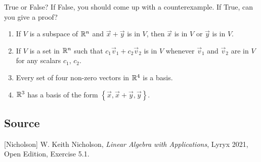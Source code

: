 \documentclass{ximera}
\author{}
\begin{document}
\begin{exercise}

True or False?  If False, you should come up with a counterexample.  If True, can you give a proof?

 \begin{enumerate}
     \item If $V$ is a subspace of $\mathbb{R}^n$ and $\vec{x}+\vec{y}$ is in $V$, then $\vec{x}$ is in $V$ or $\vec{y}$ is in $V$.

 \begin{multipleChoice}
 \end{multipleChoice}

\item If $V$ is a set in $\mathbb{R}^n$ such that $c_1{\vec{v}_1}+c_2{\vec{v}_2}$ is in $V$ whenever ${\vec{v}_1}$ and ${\vec{v}_2}$ are in $V$ for any scalars $c_1$, $c_2$.

 \begin{multipleChoice}
 \end{multipleChoice}

 \item Every set of four non-zero vectors in $\mathbb{R}^4$ is a basis.

 \begin{multipleChoice}
 \end{multipleChoice}

 \item $\mathbb{R}^3$ has a basis of the form $\left\{\vec{x},\vec{x}+\vec{y},\vec{y}\right\}$.

 \begin{multipleChoice}
 \end{multipleChoice}
 \end{enumerate}

 
\end{exercise}

\subsection*{Source}
[Nicholson] W. Keith Nicholson, {\it Linear Algebra with Applications}, Lyryx 2021, Open Edition, Exercise 5.1.
\end{document}
